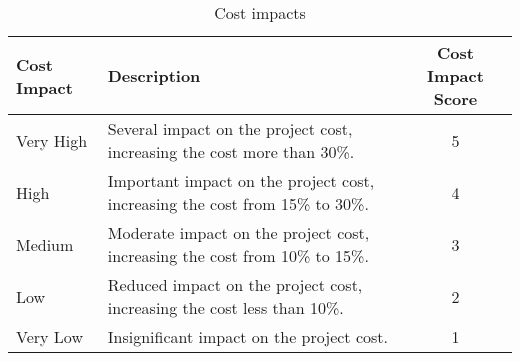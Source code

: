 	
\begin{table}[H]
	\centering
	\begin{tabular}{l >{\raggedright\arraybackslash}p{7.8cm} c}
		
		\toprule[2pt]
		
		\textbf{Cost Impact} &  \textbf{Description}  & \textbf{Cost Impact Score}\\
		
		\midrule [1.5pt]
		
		Very High & Several impact on the project cost, increasing the cost  more than 30\%. & 5\vspace{0.2cm} \\
		
		\midrule
		
		High & Important impact on the project cost, increasing the cost from 15\% to 30\%. & 4\vspace{0.2cm} \\
		
		\midrule
		
		Medium & Moderate impact on the project cost, increasing the cost from 10\% to 15\%. & 3\vspace{0.2cm} \\
	
		\midrule
	
		Low & Reduced impact on the project cost, increasing the cost  less than 10\%. & 2\vspace{0.2cm} \\
	
		\midrule
	
		Very Low & Insignificant impact on the project cost. & 1\vspace{0.2cm} \\
			
		\bottomrule[2pt]
	
	\end{tabular}
	\caption{Cost impacts}
\end{table}